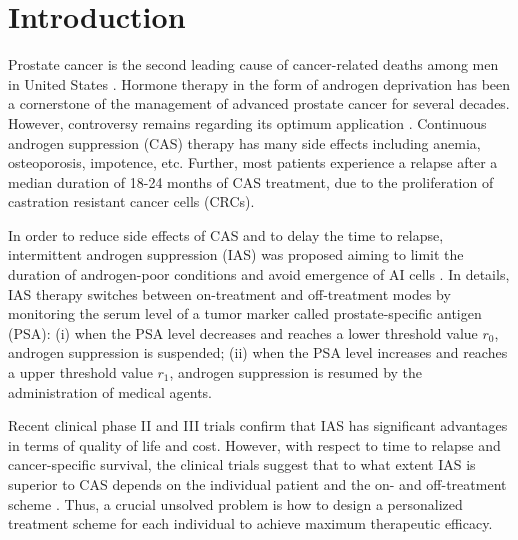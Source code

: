 \section{Introduction}
Prostate cancer is the second leading cause of cancer-related deaths among men in United States \citep{cancerstat}. Hormone therapy in the form of androgen deprivation has been a cornerstone of the management of advanced prostate cancer for several decades. However, controversy remains regarding its optimum application \citep{nru}. Continuous androgen suppression (CAS) therapy has many side effects including anemia, osteoporosis, impotence, etc. Further, most patients experience a relapse after a median duration of 18-24 months of CAS treatment, due to the proliferation of castration resistant cancer cells (CRCs).

In order to reduce side effects of CAS and to delay the time to relapse, intermittent androgen suppression (IAS) was proposed aiming to limit the duration of androgen-poor conditions and avoid emergence of AI cells \citep{bruchovsky95}. In details, IAS therapy switches between on-treatment and off-treatment modes by monitoring the serum level of a tumor marker called prostate-specific antigen (PSA):  (i) when the PSA level decreases and reaches a lower threshold value $r_0$, androgen suppression is suspended; (ii) when the PSA level increases and reaches a upper threshold value $r_1$, androgen suppression is resumed by the administration of medical agents.

Recent clinical phase II and III trials confirm that IAS has significant advantages in terms of quality of life and cost. However, with respect to time to relapse and cancer-specific survival, the clinical trials suggest that to what extent IAS is superior to CAS depends on the individual patient and the on- and off-treatment scheme \citep{bruchovsky06,bruchovsky07,book13}. Thus, a crucial unsolved problem is how to design a personalized treatment scheme for each individual to achieve maximum therapeutic efficacy.

